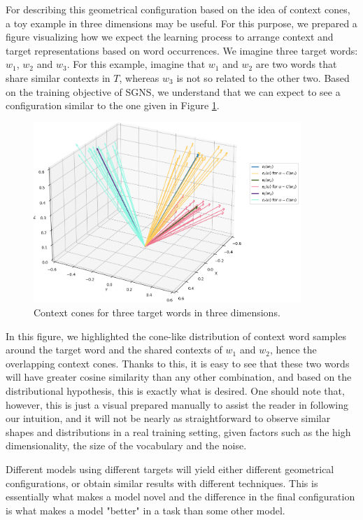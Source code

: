 For describing this geometrical configuration based on the idea of context cones, a toy example in three dimensions may be useful. For this purpose, we prepared a figure visualizing how we expect the learning process to arrange context and target representations based on word occurrences. We imagine three target words: $w_1$, $w_2$ and $w_3$. For this example, imagine that $w_1$ and $w_2$ are two words that share similar contexts in $T$, whereas $w_3$ is not so related to the other two. Based on the training objective of \ac{SGNS}, we understand that we can expect to see a configuration similar to the one given in Figure \ref{fig:cones}.


\begin{figure}[ht]
    \centering
    \includegraphics[width=0.9\textwidth]{img/context_cones.png}
    \caption{Context cones for three target words in three dimensions.}
    \label{fig:cones}
\end{figure}


In this figure, we highlighted the cone-like distribution of context word samples around the target word and the shared contexts of $w_1$ and $w_2$, hence the overlapping context cones. Thanks to this, it is easy to see that these two words will have greater cosine similarity than any other combination, and based on the distributional hypothesis, this is exactly what is desired. One should note that, however, this is just a visual prepared manually to assist the reader in following our intuition, and it will not be nearly as straightforward to observe similar shapes and distributions in a real training setting, given factors such as the high dimensionality, the size of the vocabulary and the noise.

Different models using different targets will yield either different geometrical configurations, or obtain similar results with different techniques. This is essentially what makes a model novel and the difference in the final configuration is what makes a model "better" in a task than some other model.

